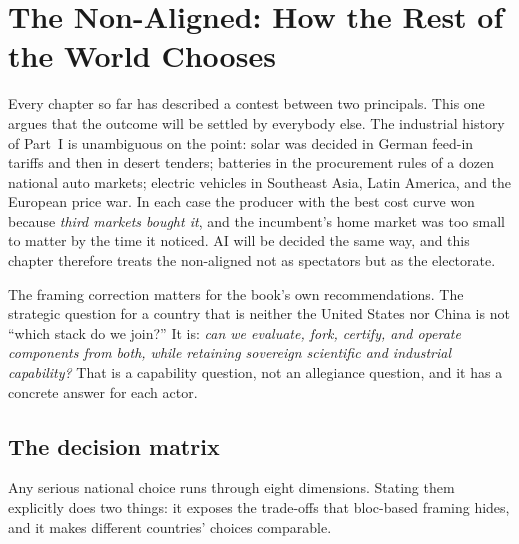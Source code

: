 \chapter{The Non-Aligned: How the Rest of the World Chooses}
\label{ch:nonaligned}

Every chapter so far has described a contest between two principals. This one argues that the outcome will be settled by everybody else. The industrial history of Part~I is unambiguous on the point: solar was decided in German feed-in tariffs and then in desert tenders; batteries in the procurement rules of a dozen national auto markets; electric vehicles in Southeast Asia, Latin America, and the European price war. In each case the producer with the best cost curve won because \emph{third markets bought it}, and the incumbent's home market was too small to matter by the time it noticed. AI will be decided the same way, and this chapter therefore treats the non-aligned not as spectators but as the electorate.

The framing correction matters for the book's own recommendations. The strategic question for a country that is neither the United States nor China is not ``which stack do we join?'' It is: \emph{can we evaluate, fork, certify, and operate components from both, while retaining sovereign scientific and industrial capability?} That is a capability question, not an allegiance question, and it has a concrete answer for each actor.

\section{The decision matrix}

Any serious national choice runs through eight dimensions. Stating them explicitly does two things: it exposes the trade-offs that bloc-based framing hides, and it makes different countries' choices comparable.

